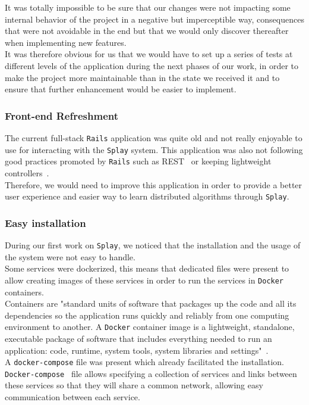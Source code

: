 \documentclass{eplmastersthesis}
\begin{document}
          It was totally impossible to be sure that our changes were not
          impacting some internal behavior of the project in a negative but
          imperceptible way, consequences that were not avoidable in the end
          but that we would only discover thereafter when implementing new
          features.\\
          It was therefore obvious for us that we would have to set up a series
          of tests at different levels of the application during the next
          phases of our work, in order to make the project more maintainable
          than in the state we received it and to ensure that further
          enhancement would be easier to implement.

        \subsubsection{Front-end Refreshment}

          The current full-stack \texttt{Rails} application was quite old and not
          really enjoyable to use for interacting with the \texttt{Splay}
          system. This application was also not following good practices
          promoted by \texttt{Rails} such as REST~\cite{rest} or keeping lightweight
          controllers~\cite{fatmod}.\\
          Therefore, we would need to improve this application in order to
          provide a better user experience and easier way to learn distributed
          algorithms through \texttt{Splay}.

        \subsubsection{Easy installation}

          During our first work on \texttt{Splay}, we noticed that the
          installation and the usage of the system were not easy to handle.\\

          Some services were dockerized, this means that dedicated files
          were present to allow creating images of these services in order
          to run the services in \texttt{Docker} containers.\\
          Containers are "standard units of software that packages up the code and
          all its dependencies so the application runs quickly and reliably
          from one computing environment to another. A \texttt{Docker} container image
          is a lightweight, standalone, executable package of software that
          includes everything needed to run an application: code, runtime,
          system tools, system libraries and settings"~\cite{dockercontainer}.\\
          A \texttt{docker-compose} file was present which already facilitated the
          installation. \texttt{Docker-compose}~\cite{dockercompose} file allows specifying  a
          collection of services and links between these services so that
          they will share a common network, allowing easy communication
          between each service.\\
\end{document}
